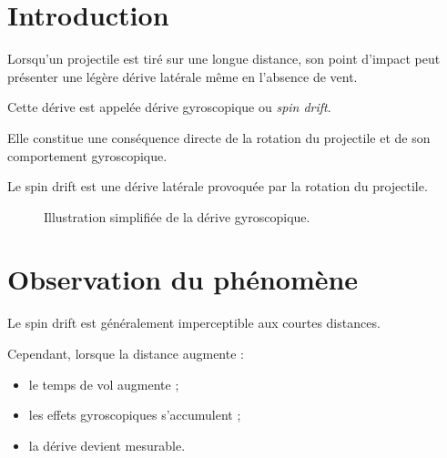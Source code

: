 
\section{Introduction}

Lorsqu'un projectile est tiré sur une longue distance, son point d'impact
peut présenter une légère dérive latérale même en l'absence de vent.

Cette dérive est appelée dérive gyroscopique ou \emph{spin drift}.

Elle constitue une conséquence directe de la rotation du projectile et de son
comportement gyroscopique.

\begin{aretenir}

Le spin drift est une dérive latérale provoquée par la rotation du
projectile.

\end{aretenir}

\begin{figure}[htbp]
\centering
{}
\caption{Illustration simplifiée de la dérive gyroscopique.}
\label{fig:spin_drift}
\end{figure}

\section{Observation du phénomène}

Le spin drift est généralement imperceptible aux courtes distances.

Cependant, lorsque la distance augmente :

\begin{itemize}
    \item le temps de vol augmente ;
    \item les effets gyroscopiques s'accumulent ;
    \item la dérive devient mesurable.
\end{itemize}


